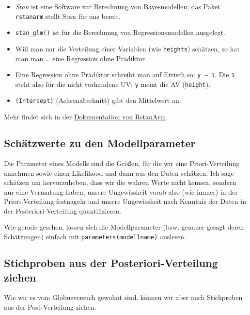 \documentclass[
  a4paper,
  DIV=11]{scrreprt}
\providecommand{\tightlist}{%
  \setlength{\itemsep}{0pt}\setlength{\parskip}{0pt}}\usepackage{longtable,booktabs,array}
\theoremstyle{definition}
\theoremstyle{remark}
\begin{document}
\begin{itemize}
\tightlist
\item
  \emph{Stan} ist eine Software zur Berechnung von Bayesmodellen; das
  Paket \texttt{rstanarm} stellt Stan für uns bereit.
\item
  \texttt{stan\_glm()} ist für die Berechnung von Regressionsmodellen
  ausgelegt.
\item
  Will man nur die Verteilung einer Variablen (wie \texttt{heights})
  schätzen, so hat man man \ldots{} eine Regression ohne Prädiktor.
\item
  Eine Regression ohne Prädiktor schreibt man auf Errisch so:
  \texttt{y\ \textasciitilde{}\ 1}. Die \texttt{1} steht also für die
  nicht vorhandene UV; \texttt{y} meint die AV (\texttt{height}).
\item
  \texttt{(Intercept)} (Achsenabschnitt) gibt den Mittelwert an.
\end{itemize}

Mehr findet sich in der
\href{https://mc-stan.org/rstanarm/}{Dokumentation von RstanArm}.

\hypertarget{schuxe4tzwerte-zu-den-modellparameter}{%
\subsection{Schätzwerte zu den
Modellparameter}\label{schuxe4tzwerte-zu-den-modellparameter}}

Die Parameter eines Modells sind die Größen, für die wir eine
Priori-Verteilung annehmen sowie einen Likelihood und dann aus den Daten
schätzen. Ich sage schätzen um hervorzuheben, dass wir die wahren Werte
nicht kennen, sondern nur eine Vermutung haben, unsere Ungewissheit
vorab also (wie immer) in der Priori-Verteilung festnageln und unsere
Ungewissheit nach Kenntnis der Daten in der Posteriori-Verteilung
quantifizieren.

Wie gerade gesehen, lassen sich die Modellparameter (bzw. genauer gesagt
deren Schätzungen) einfach mit \texttt{parameters(modellname)} auslesen.

\hypertarget{stichproben-aus-der-posteriori-verteilung-ziehen}{%
\subsection{Stichproben aus der Posteriori-Verteilung
ziehen}\label{stichproben-aus-der-posteriori-verteilung-ziehen}}

Wie wir es vom Globusversuch gewohnt sind, können wir aber auch
Stichproben aus der Post-Verteilung ziehen.
\end{document}

